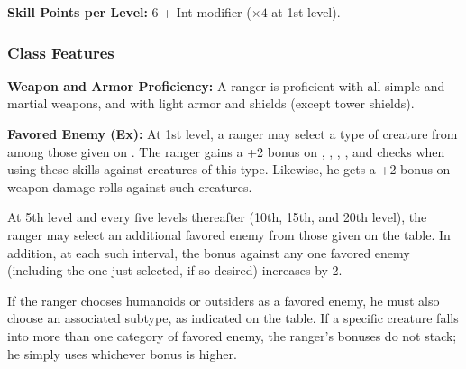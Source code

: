 \textbf{Skill Points per Level:} 6 + Int modifier ($\times 4$ at 1st level).

\subsubsection{Class Features}

\textbf{Weapon and Armor Proficiency:} A ranger is proficient with all simple and martial weapons, and with light armor and shields (except tower shields).

\textbf{Favored Enemy (Ex):} At 1st level, a ranger may select a type of creature from among those given on . The ranger gains a +2 bonus on , , , , and  checks when using these skills against creatures of this type. Likewise, he gets a +2 bonus on weapon damage rolls against such creatures.

At 5th level and every five levels thereafter (10th, 15th, and 20th level), the ranger may select an additional favored enemy from those given on the table. In addition, at each such interval, the bonus against any one favored enemy (including the one just selected, if so desired) increases by 2.

If the ranger chooses humanoids or outsiders as a favored enemy, he must also choose an associated subtype, as indicated on the table. If a specific creature falls into more than one category of favored enemy, the ranger's bonuses do not stack; he simply uses whichever bonus is higher.

